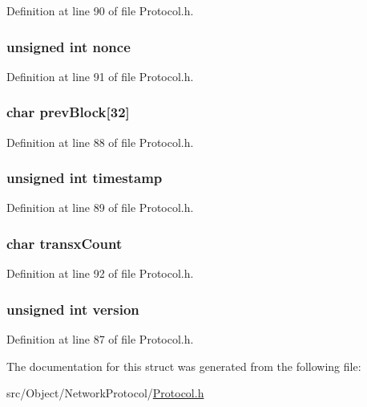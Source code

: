 Definition at line 90 of file Protocol.h.

\hypertarget{struct_block_header_ad73ee4141a6536b03f4e493b56859e86}{
\subsubsection[{nonce}]{\setlength{\rightskip}{0pt plus 5cm}unsigned int {\bf nonce}}}
\label{struct_block_header_ad73ee4141a6536b03f4e493b56859e86}


Definition at line 91 of file Protocol.h.

\hypertarget{struct_block_header_a099897f937ebe9e9634c5098e38c7cab}{
\subsubsection[{prevBlock}]{\setlength{\rightskip}{0pt plus 5cm}char {\bf prevBlock}\mbox{[}32\mbox{]}}}
\label{struct_block_header_a099897f937ebe9e9634c5098e38c7cab}


Definition at line 88 of file Protocol.h.

\hypertarget{struct_block_header_ad4048a3c215cbfcdc127ada8e0fa5445}{
\subsubsection[{timestamp}]{\setlength{\rightskip}{0pt plus 5cm}unsigned int {\bf timestamp}}}
\label{struct_block_header_ad4048a3c215cbfcdc127ada8e0fa5445}


Definition at line 89 of file Protocol.h.

\hypertarget{struct_block_header_a343e4b09bfd545fad5745f6c48f15b69}{
\subsubsection[{transxCount}]{\setlength{\rightskip}{0pt plus 5cm}char {\bf transxCount}}}
\label{struct_block_header_a343e4b09bfd545fad5745f6c48f15b69}


Definition at line 92 of file Protocol.h.

\hypertarget{struct_block_header_a5408ac5df4c170828874e1b10b4c35a0}{
\subsubsection[{version}]{\setlength{\rightskip}{0pt plus 5cm}unsigned int {\bf version}}}
\label{struct_block_header_a5408ac5df4c170828874e1b10b4c35a0}


Definition at line 87 of file Protocol.h.



The documentation for this struct was generated from the following file:\begin{DoxyCompactItemize}
\item 
src/Object/NetworkProtocol/\hyperlink{_protocol_8h}{Protocol.h}\end{DoxyCompactItemize}
